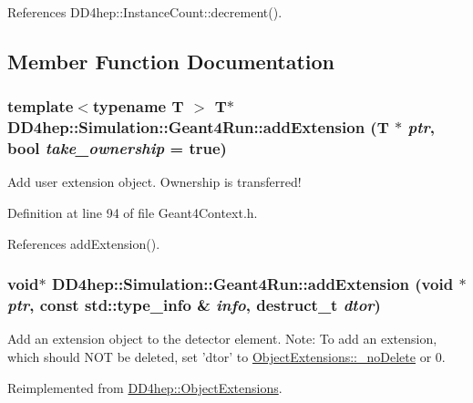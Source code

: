 References DD4hep::InstanceCount::decrement().

\subsection{Member Function Documentation}
\hypertarget{class_d_d4hep_1_1_simulation_1_1_geant4_run_a424d56711e2ba1837617834a1c1b0106}{
\subsubsection[{addExtension}]{\setlength{\rightskip}{0pt plus 5cm}template$<$typename T $>$ {\bf T}$\ast$ DD4hep::Simulation::Geant4Run::addExtension ({\bf T} $\ast$ {\em ptr}, \/  bool {\em take\_\-ownership} = {\ttfamily true})}}
\label{class_d_d4hep_1_1_simulation_1_1_geant4_run_a424d56711e2ba1837617834a1c1b0106}


Add user extension object. Ownership is transferred! 

Definition at line 94 of file Geant4Context.h.

References addExtension().\hypertarget{class_d_d4hep_1_1_simulation_1_1_geant4_run_aa825451bec9637a51d98d46e23334b75}{
\subsubsection[{addExtension}]{\setlength{\rightskip}{0pt plus 5cm}void$\ast$ DD4hep::Simulation::Geant4Run::addExtension (void $\ast$ {\em ptr}, \/  const std::type\_\-info \& {\em info}, \/  {\bf destruct\_\-t} {\em dtor})}}
\label{class_d_d4hep_1_1_simulation_1_1_geant4_run_aa825451bec9637a51d98d46e23334b75}


Add an extension object to the detector element. Note: To add an extension, which should NOT be deleted, set 'dtor' to \hyperlink{class_d_d4hep_1_1_object_extensions_a0c32fb2af89407102b494ab9c15f9eac}{ObjectExtensions::\_\-noDelete} or 0. 

Reimplemented from \hyperlink{class_d_d4hep_1_1_object_extensions_a9e4010c2b9cbfda1455c10821a3cae85}{DD4hep::ObjectExtensions}.

